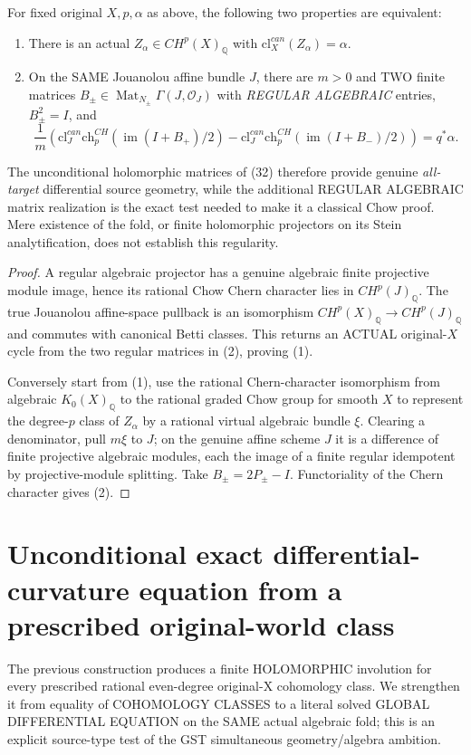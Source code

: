 \documentclass[11pt]{article}
\begin{document}
\begin{proposition}
For fixed original $X,p,\alpha$ as above, the following
two properties are equivalent:
\begin{enumerate}
\item There is an actual $Z_\alpha\in CH^p(X)_{\mathbb Q}$
      with $\mathrm{cl}^{can}_X(Z_\alpha)=\alpha$.
\item On the SAME Jouanolou affine bundle $J$, there are
      $m>0$ and TWO finite matrices
      $B_\pm\in\operatorname{Mat}_{N_\pm}
                   \Gamma(J,\mathcal O_J)$ with
      \emph{REGULAR ALGEBRAIC} entries,
      $B_\pm^2=I$, and
\[
 \frac1m\left(
   \mathrm{cl}^{can}_J
       \mathrm{ch}^{CH}_p(\operatorname{im}(I+B_+)/2)
 - \mathrm{cl}^{can}_J
       \mathrm{ch}^{CH}_p(\operatorname{im}(I+B_-)/2)
 \right)=q^*\alpha .
\]
\end{enumerate}
The unconditional holomorphic matrices of (32)
therefore provide genuine \emph{all-target} differential
source geometry, while the additional REGULAR ALGEBRAIC
matrix realization is the exact test needed to make it
a classical Chow proof. Mere existence of the fold,
or finite holomorphic projectors on its Stein
analytification, does not establish this regularity.
\end{proposition}
\begin{proof}
A regular algebraic projector has a genuine algebraic
finite projective module image, hence its rational
Chow Chern character lies in $CH^p(J)_{\mathbb Q}$.
The true Jouanolou affine-space pullback is an
isomorphism $CH^p(X)_{\mathbb Q}\to CH^p(J)_{\mathbb Q}$
and commutes with canonical Betti classes.
This returns an ACTUAL original-$X$ cycle
from the two regular matrices in (2), proving (1).

Conversely start from (1), use the rational
Chern-character isomorphism from algebraic
$K_0(X)_{\mathbb Q}$ to the rational graded Chow
group for smooth $X$ to represent the degree-$p$
class of $Z_\alpha$ by a rational virtual
algebraic bundle $\xi$. Clearing a denominator,
pull $m\xi$ to $J$; on the genuine affine
scheme $J$ it is a difference of finite projective
algebraic modules, each the image of a finite
regular idempotent by projective-module splitting.
Take $B_\pm=2P_\pm-I$. Functoriality of the
Chern character gives (2).
\end{proof}



\section{Unconditional exact differential-curvature equation from a prescribed original-world class}
The previous construction produces a finite HOLOMORPHIC involution for
every prescribed rational even-degree original-X cohomology class.
We strengthen it from equality of COHOMOLOGY CLASSES
to a literal solved GLOBAL DIFFERENTIAL EQUATION on the SAME
actual algebraic fold; this is an explicit source-type test of the
GST simultaneous geometry/algebra ambition.
\end{document}
